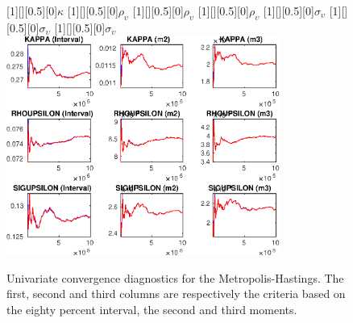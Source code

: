 \begin{figure}[H]
[1][][0.5][0]{$ {\kappa} $}
[1][][0.5][0]{$ {\rho_\upsilon} $}
[1][][0.5][0]{$ {\rho_\upsilon} $}
[1][][0.5][0]{$ {\rho_\upsilon} $}
[1][][0.5][0]{$ {\sigma_\upsilon} $}
[1][][0.5][0]{$ {\sigma_\upsilon} $}
[1][][0.5][0]{$ {\sigma_\upsilon} $}
\centering 
\includegraphics[width=0.80\textwidth]{KimModTheBuilder/Output/KimModTheBuilder_udiag3}
\caption{Univariate convergence diagnostics for the Metropolis-Hastings.
The first, second and third columns are respectively the criteria based on
the eighty percent interval, the second and third moments.}\label{Fig:UnivariateDiagnostics:3}
\end{figure}

